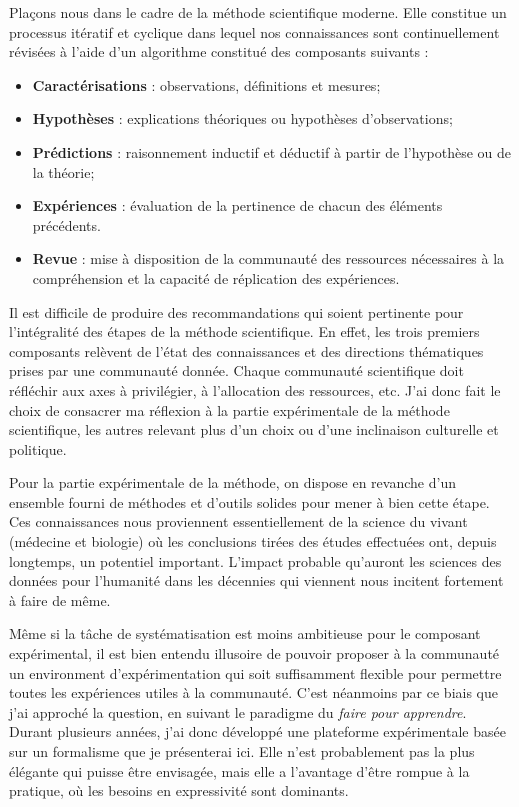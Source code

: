Plaçons nous dans le cadre de la méthode scientifique moderne. Elle constitue un processus itératif et cyclique dans lequel nos connaissances sont continuellement révisées à l'aide d'un algorithme constitué des composants suivants :
\begin{itemize}
  \item \textbf{Caractérisations} : observations, définitions et mesures;
  \item \textbf{Hypothèses} : explications théoriques ou hypothèses d'observations;
  \item \textbf{Prédictions} : raisonnement inductif et déductif à partir de l'hypothèse ou de la théorie;
  \item \textbf{Expériences} : évaluation de la pertinence de chacun des éléments précédents.
  \item \textbf{Revue} : mise à disposition  de la communauté des ressources nécessaires à la compréhension et la capacité de réplication des expériences.
\end{itemize}

Il est difficile de produire des recommandations qui soient pertinente pour l'intégralité des étapes de la méthode scientifique. En effet, les trois premiers composants relèvent de l'état des connaissances et des \og directions \fg thématiques prises par une communauté donnée. Chaque communauté scientifique doit réfléchir aux axes à privilégier, à l'allocation des ressources, etc. J'ai donc fait le choix de consacrer ma réflexion à la partie expérimentale de la méthode scientifique, les autres relevant plus d'un choix ou d'une inclinaison culturelle et politique.

Pour la partie expérimentale de la méthode, on dispose en revanche d'un ensemble fourni de méthodes et d'outils solides pour mener à bien cette étape. Ces connaissances nous proviennent essentiellement de la science du vivant (médecine et biologie) où les conclusions tirées des études effectuées ont, depuis longtemps, un potentiel important. L'impact probable qu'auront les sciences des données pour l'humanité dans les décennies qui viennent nous incitent fortement à faire de même.

Même si la tâche de systématisation est moins ambitieuse pour le composant expérimental, il est bien entendu illusoire de pouvoir proposer à la communauté un environment d'expérimentation qui soit suffisamment flexible pour permettre toutes les expériences utiles à la communauté. C'est néanmoins par ce biais que j'ai approché la question, en suivant le paradigme du \textsl{faire pour apprendre}. Durant plusieurs années, j'ai donc développé une plateforme expérimentale basée sur un formalisme que je présenterai ici. Elle n'est probablement pas la plus élégante qui puisse être envisagée, mais elle a l'avantage d'être rompue à la pratique, où les besoins en expressivité sont dominants.

